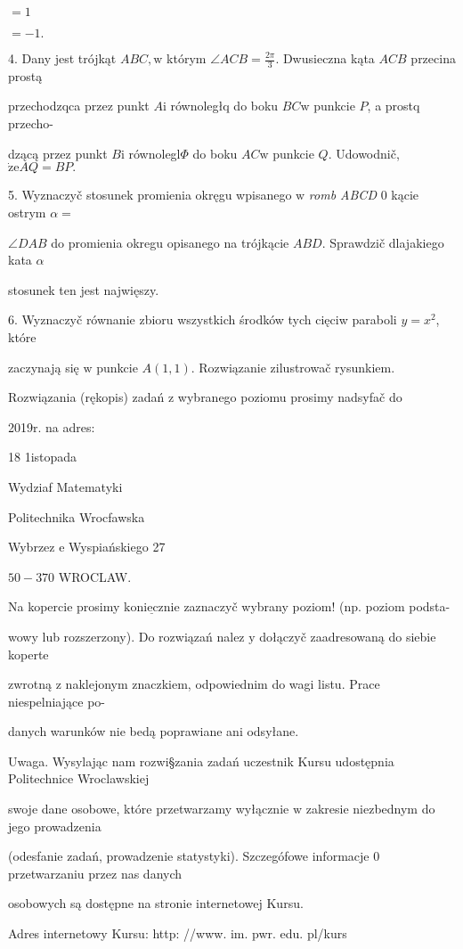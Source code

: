 \documentclass[a4paper,12pt]{article}
\begin{document}
$=1$

$=-1.$

4. Dany jest trójkąt $ABC, \mathrm{w}$ którym $\displaystyle \angle ACB=\frac{2\pi}{3}$. Dwusieczna kąta $ACB$ przecina prostą

przechodzqca przez punkt $A\mathrm{i}$ równoległq do boku $BC\mathrm{w}$ punkcie $P$, a prostq przecho-

dzącą przez punkt $B\mathrm{i}$ równolegl$\Phi$ do boku $AC\mathrm{w}$ punkcie $Q$. Udowodnič, $\dot{\mathrm{z}}\mathrm{e}AQ=BP.$

5. Wyznaczyč stosunek promienia okręgu wpisanego $\mathrm{w}$ {\it romb ABCD} $0$ kącie ostrym $\alpha=$

$\angle DAB$ do promienia okregu opisanego na trójkącie $ABD$. Sprawdzič dlajakiego kata $\alpha$

stosunek ten jest najwięszy.

6. Wyznaczyč równanie zbioru wszystkich środków tych cięciw paraboli $y = x^{2}$, które

zaczynają się $\mathrm{w}$ punkcie $A(1,1)$. Rozwiązanie zilustrowač rysunkiem.

Rozwiązania (rękopis) zadań z wybranego poziomu prosimy nadsyfač do

2019r. na adres:

18 1istopada

Wydziaf Matematyki

Politechnika Wrocfawska

Wybrzez $\mathrm{e}$ Wyspiańskiego 27

$50-370$ WROCLAW.

Na kopercie prosimy $\underline{\mathrm{k}\mathrm{o}\mathrm{n}\mathrm{i}\mathrm{e}\mathrm{c}\mathrm{z}\mathrm{n}\mathrm{i}\mathrm{e}}$ zaznaczyč wybrany poziom! (np. poziom podsta-

wowy lub rozszerzony). Do rozwiązań nalez $\mathrm{y}$ dołączyč zaadresowaną do siebie koperte

zwrotną $\mathrm{z}$ naklejonym znaczkiem, odpowiednim do wagi listu. Prace niespelniające po-

danych warunków nie bedą poprawiane ani odsyłane.

Uwaga. Wysylając nam rozwi\S zania zadań uczestnik Kursu udostępnia Politechnice Wroclawskiej

swoje dane osobowe, które przetwarzamy wyłącznie $\mathrm{w}$ zakresie niezbednym do jego prowadzenia

(odesfanie zadań, prowadzenie statystyki). Szczegófowe informacje $0$ przetwarzaniu przez nas danych

osobowych są dostępne na stronie internetowej Kursu.

Adres internetowy Kursu: http: //www. im. pwr. edu. pl/kurs
\end{document}
